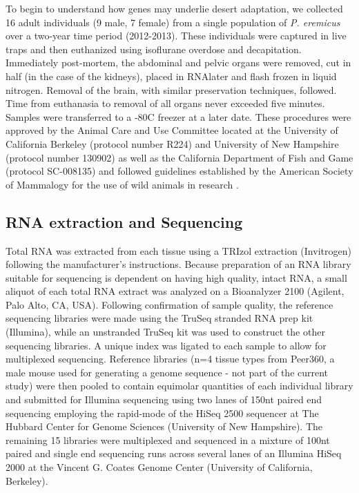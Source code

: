 \documentclass[12pt]{article}
\begin{document}
To begin to understand how genes may underlie desert adaptation, we collected 16 adult individuals (9 male, 7 female) from a single population of \textit{P. eremicus} over a two-year time period (2012-2013). These individuals were captured in live traps and then euthanized using isoflurane overdose and decapitation. Immediately post-mortem, the abdominal and pelvic organs were removed, cut in half (in the case of the kidneys), placed in RNAlater and flash frozen in liquid nitrogen. Removal of the brain, with similar preservation techniques, followed. Time from euthanasia to removal of all organs never exceeded five minutes. Samples were transferred to a -80C freezer at a later date. These procedures were approved by the Animal Care and Use Committee located at the University of California Berkeley (protocol number R224) and University of New Hampshire (protocol number 130902) as well as the California Department of Fish and Game (protocol SC-008135) and followed guidelines established by the American Society of Mammalogy for the use of wild animals in research \citep{Sikes:2011dz}.  

\subsection*{RNA extraction and Sequencing}

Total RNA was extracted from each tissue using a TRIzol extraction (Invitrogen) following the manufacturer's instructions. Because preparation of an RNA library suitable for sequencing is dependent on having high
quality, intact RNA, a small aliquot of each total RNA extract was
analyzed on a Bioanalyzer 2100 (Agilent, Palo Alto, CA, USA).
Following confirmation of sample quality, the reference sequencing libraries
were made using the TruSeq stranded RNA prep kit
(Illumina), while an unstranded TruSeq kit was used to construct the other sequencing libraries. A unique index was ligated to each sample to allow for multiplexed sequencing. Reference libraries (n=4 tissue types from Peer360, a male mouse used for generating a genome sequence - not part of the current study) were then pooled to contain equimolar quantities of each individual library and
submitted for Illumina sequencing using two lanes of 150nt paired end sequencing employing the rapid-mode of the HiSeq 2500 sequencer at The Hubbard Center for Genome Sciences (University of New Hampshire). The remaining 15 libraries were multiplexed and sequenced in a mixture of 100nt paired and single end sequencing runs across several lanes of an Illumina HiSeq 2000 at the Vincent G. Coates Genome Center (University of California, Berkeley).
\end{document}
